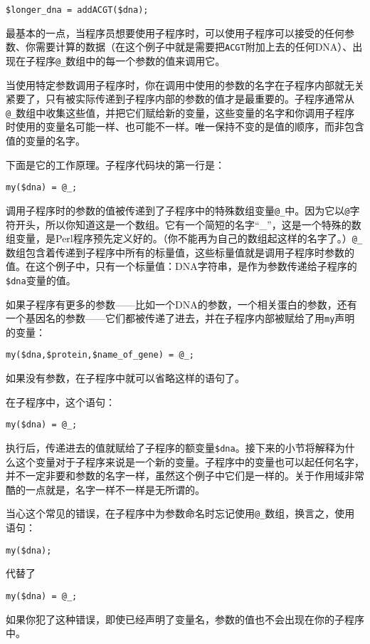 \begin{lstlisting}
$longer_dna = addACGT($dna);
\end{lstlisting}

最基本的一点，当程序员想要使用子程序时，可以使用子程序可以接受的任何参数、你需要计算的数据（在这个例子中就是需要把\verb|ACGT|附加上去的任何DNA）、出现在子程序\verb|@_|数组中的每一个参数的值来调用它。

当使用特定参数调用子程序时，你在调用中使用的参数的名字在子程序内部就无关紧要了，只有被实际传递到子程序内部的参数的值才是最重要的。子程序通常从\verb|@_|数组中收集这些值，并把它们赋给新的变量，这些变量的名字和你调用子程序时使用的变量名可能一样、也可能不一样。唯一保持不变的是值的顺序，而非包含值的变量的名字。

下面是它的工作原理。子程序代码块的第一行是：

\begin{lstlisting}
my($dna) = @_; 
\end{lstlisting}

调用子程序时的参数的值被传递到了子程序中的特殊数组变量\verb|@_|中。因为它以\verb|@|字符开头，所以你知道这是一个数组。它有一个简短的名字“\_”，这是一个特殊的数组变量，是Perl程序预先定义好的。（你不能再为自己的数组起这样的名字了。）\verb|@_|数组包含着传递到子程序中所有的标量值，这些标量值就是调用子程序时参数的值。在这个例子中，只有一个标量值：DNA字符串，是作为参数传递给子程序的\verb|$dna|变量的值。

如果子程序有更多的参数——比如一个DNA的参数，一个相关蛋白的参数，还有一个基因名的参数——它们都被传递了进去，并在子程序内部被赋给了用\verb|my|声明的变量：

\begin{lstlisting}
my($dna,$protein,$name_of_gene) = @_;
\end{lstlisting}

如果没有参数，在子程序中就可以省略这样的语句了。

在子程序中，这个语句：

\begin{lstlisting}
my($dna) = @_;
\end{lstlisting}

执行后，传递进去的值就赋给了子程序的额变量\verb|$dna|。接下来的小节将解释为什么这个变量对于子程序来说是一个新的变量。子程序中的变量也可以起任何名字，并不一定非要和参数的名字一样，虽然这个例子中它们是一样的。关于作用域非常酷的一点就是，名字一样不一样是无所谓的。

\begin{adjustwidth}{4em}{4em}
\noindent
当心这个常见的错误，在子程序中为参数命名时忘记使用\verb|@_|数组，换言之，使用语句：
  \begin{lstlisting}
my($dna);
  \end{lstlisting}
  代替了
  \begin{lstlisting}
my($dna) = @_;
  \end{lstlisting}
  如果你犯了这种错误，即使已经声明了变量名，参数的值也不会出现在你的子程序中。
\end{adjustwidth}

